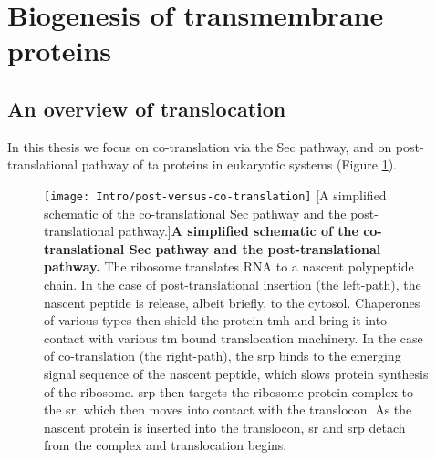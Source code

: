 \section{Biogenesis of transmembrane proteins}
\subsection{An overview of translocation}
In this thesis we focus on co\--translation via the Sec pathway, and on post\--translational pathway of \gls{ta} proteins in eukaryotic systems (Figure \ref{fig:post-versus-co-translation}).

\begin{figure}[ht]
\centering
\texttt{[image: Intro/post-versus-co-translation]}
		[A simplified schematic of the co\--translational Sec pathway and the post\--translational pathway.]{\textbf{A simplified schematic of the co\--translational Sec pathway and the post\--translational pathway.}
		The ribosome translates RNA to a nascent polypeptide chain.
		In the case of post\--translational insertion (the left\--path), the nascent peptide is release, albeit briefly, to the cytosol.
		Chaperones of various types then shield the protein \gls{tmh} and bring it into contact with various \gls{tm} bound translocation machinery.
		In the case of co\--translation (the right\--path), the \gls{srp} binds to the emerging signal sequence of the nascent peptide, which slows protein synthesis of the ribosome.
		\gls{srp} then targets the ribosome protein complex to the \gls{sr}, which then moves into contact with the translocon.
		As the nascent protein is inserted into the translocon, \gls{sr} and \gls{srp} detach from the complex and translocation begins.
		}
\label{fig:post-versus-co-translation}
\end{figure}

